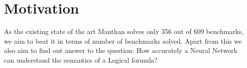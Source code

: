 \section{Motivation}

As the existing state of the art Manthan solves only 356 out of 609 benchmarks, we aim to beat it in terms of number of benchmarks solved. Apart from this we also aim to find out answer to the question: How accurately a Neural Network can understand the semantics of a Logical formula?